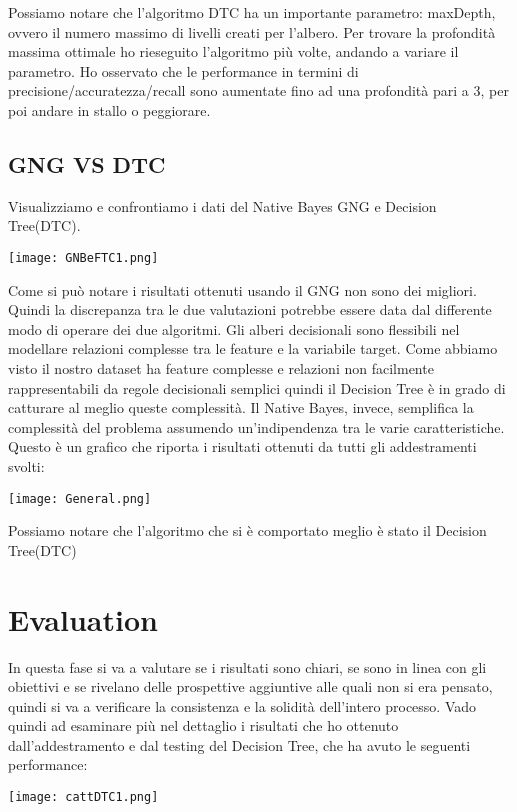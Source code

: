 \documentclass{article}
\begin{document}
Possiamo notare che l’algoritmo DTC ha un importante parametro: maxDepth, ovvero il numero massimo di livelli creati per l’albero. Per trovare la profondità massima ottimale ho rieseguito l’algoritmo più volte, andando a variare il parametro. Ho osservato che le performance in termini di precisione/accuratezza/recall sono aumentate fino ad una profondità pari a 3, per poi andare in stallo o peggiorare.


\subsection{GNG VS DTC}

Visualizziamo e confrontiamo i dati del Native Bayes GNG e Decision Tree(DTC).
\begin{center}
  \texttt{[image: GNBeFTC1.png]}
\end{center}

Come si può notare i risultati ottenuti usando il GNG non sono dei migliori. Quindi la discrepanza tra le due valutazioni potrebbe essere data dal differente modo di operare dei due algoritmi. Gli alberi decisionali sono flessibili nel modellare relazioni complesse tra le feature e la variabile target. Come abbiamo visto  il nostro dataset ha feature complesse e relazioni non facilmente rappresentabili da regole decisionali semplici quindi il Decision Tree è in grado di catturare al meglio queste complessità. Il Native Bayes, invece, semplifica la complessità del problema assumendo un'indipendenza tra le varie caratteristiche. Questo è un grafico che riporta i risultati ottenuti da tutti gli addestramenti
svolti:
\begin{center}
  \texttt{[image: General.png]}
\end{center}

Possiamo notare che l'algoritmo che si è comportato meglio è stato il Decision Tree(DTC)

\newpage
\section{Evaluation}
In questa fase si va a valutare se i risultati sono chiari, se sono in linea con gli obiettivi e se rivelano
delle prospettive aggiuntive alle quali non si era pensato, quindi si va a verificare la consistenza e la
solidità dell’intero processo. Vado quindi ad esaminare più nel dettaglio i risultati che ho ottenuto dall’addestramento e dal testing del Decision Tree, che ha avuto le seguenti performance:
\begin{center}
  \texttt{[image: cattDTC1.png]}
\end{center}
\end{document}

